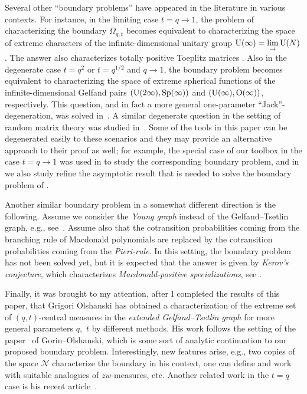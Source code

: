 \documentclass[pdftex]{sigma}
\numberwithin{equation}{section}
\newcommand{\Nu}{\mathcal{N}}
\begin{document}
Several other ``boundary problems'' have appeared in the literature in various contexts. For instance, in the limiting case $t = q \rightarrow 1$, the problem of characterizing the boundary $\Omega_{q, t}$ becomes equivalent to characterizing the space of extreme characters of the inf\/inite-dimensional unitary group ${\rm U}(\infty) = \lim\limits_{\rightarrow}{{\rm U}(N)}$. The answer also characterizes totally positive Toeplitz matrices \cite{Ed, VK, Voi}. Also in the degenerate case $t = q^2$ or $t = q^{1/2}$ and $q\rightarrow 1$, the boundary problem becomes equivalent to characterizing the space of extreme spherical functions of the inf\/inite-dimensional Gelfand pairs $({\rm U}(2\infty), {\rm Sp}(\infty))$ and $({\rm U}(\infty), {\rm O}(\infty))$, respectively. This question, and in fact a more general one-parameter ``Jack''-degeneration, was solved in~\cite{OO1}. A similar degenerate question in the setting of random matrix theory was studied in~\cite{OlV}. Some of the tools in this paper can be degenerated easily to these scenarios and they may provide an alternative approach to their proof as well; for example, the special case of our toolbox in the case $t = q \rightarrow 1$ was used in \cite{GP} to study the corresponding boundary problem, and in \cite{Cu} we also study ref\/ine the asymptotic result that is needed to solve the boundary problem of \cite{OO1}.

Another similar boundary problem in a somewhat dif\/ferent direction is the following. Assume we consider the \textit{Young graph} instead of the Gelfand--Tsetlin graph, e.g., see~\cite{BOl}. Assume also that the cotransition probabilities coming from the branching rule of Macdonald polynomials are replaced by the cotransition probabilities coming from the \textit{Pieri-rule}. In this setting, the boundary problem has not been solved yet, but it is expected that the answer is given by \textit{Kerov's conjecture}, which characterizes \textit{Macdonald-positive specializations}, see \cite[Section~2]{BC}.

Finally, it was brought to my attention, after I completed the results of this paper, that Grigori Olshanski has obtained a characterization of the extreme set of $(q, t)$-central measures in the \textit{extended Gelfand--Tsetlin graph} for more general parameters $q$,~$t$ by dif\/ferent methods. His work follows the setting of the paper~\cite{GOl} of Gorin--Olshanski, which is some sort of analytic continuation to our proposed boundary problem. Interestingly, new features arise, e.g., two copies of the space $\Nu$ characterize the boundary in his context, one can def\/ine and work with suitable analogues of $zw$-measures, etc. Another related work in the $t = q$ case is his recent article~\cite{Ol0}.
\end{document}
